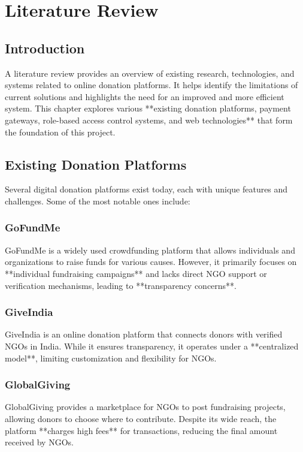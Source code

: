 \chapter{Literature Review}

\section{Introduction}
A literature review provides an overview of existing research, technologies, and systems related to online donation platforms. It helps identify the limitations of current solutions and highlights the need for an improved and more efficient system. This chapter explores various **existing donation platforms, payment gateways, role-based access control systems, and web technologies** that form the foundation of this project.

\section{Existing Donation Platforms}
Several digital donation platforms exist today, each with unique features and challenges. Some of the most notable ones include:

\subsection{GoFundMe}
GoFundMe is a widely used crowdfunding platform that allows individuals and organizations to raise funds for various causes. However, it primarily focuses on **individual fundraising campaigns** and lacks direct NGO support or verification mechanisms, leading to **transparency concerns**.

\subsection{GiveIndia}
GiveIndia is an online donation platform that connects donors with verified NGOs in India. While it ensures transparency, it operates under a **centralized model**, limiting customization and flexibility for NGOs.

\subsection{GlobalGiving}
GlobalGiving provides a marketplace for NGOs to post fundraising projects, allowing donors to choose where to contribute. Despite its wide reach, the platform **charges high fees** for transactions, reducing the final amount received by NGOs.


